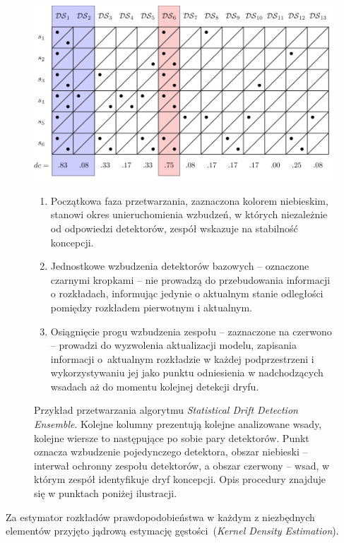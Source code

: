 \begin{figure}[!htb]
	\centering
	\includegraphics[width=\textwidth, clip=true]{figures/sdde}
	
\begin{enumerate}
	\item Początkowa faza przetwarzania, zaznaczona kolorem niebieskim, stanowi okres unieruchomienia wzbudzeń, w których niezależnie od odpowiedzi detektorów, zespół wskazuje na stabilność koncepcji. 
	\item Jednostkowe wzbudzenia detektorów bazowych -- oznaczone czarnymi kropkami -- nie prowadzą do przebudowania informacji o rozkładach, informując jedynie o aktualnym stanie odległości pomiędzy rozkładem pierwotnym i aktualnym.
	\item Osiągnięcie progu wzbudzenia zespołu -- zaznaczone na czerwono -- prowadzi do wyzwolenia aktualizacji modelu, zapisania informacji o~aktualnym rozkładzie w każdej podprzestrzeni i wykorzystywaniu jej jako punktu odniesienia w nadchodzących wsadach aż do momentu kolejnej detekcji dryfu.
\end{enumerate}


	\caption{Przykład przetwarzania algorytmu \emph{Statistical Drift Detection Ensemble}. Kolejne kolumny prezentują kolejne analizowane wsady, kolejne wiersze to następujące po sobie pary detektorów. Punkt oznacza wzbudzenie pojedynczego detektora, obszar niebieski -- interwał ochronny zespołu detektorów, a obszar czerwony -- wsad, w którym zespół identyfikuje dryf koncepcji. Opis procedury znajduje się w punktach poniżej ilustracji.}\label{fig:sdde}
\end{figure}

Za estymator rozkładów prawdopodobieństwa w każdym z niezbędnych elementów przyjęto jądrową estymację gęstości (\emph{Kernel Density Estimation}).

